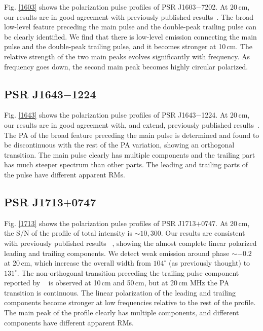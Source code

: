 \documentclass[useAMS,usenatbib]{mn2e}
\begin{document}
\begin{appendix}
Fig. \ref{1603} shows the polarization pulse profiles of 
PSR J1603$-$7202.
%
At 20\,cm, our results are in good agreement with previously published
results~\citep{Ord04,Yan11}.
%
The broad low-level feature preceding the main pulse and the double-peak trailing 
pulse can be clearly identified.
%
We find that there is low-level emission connecting the main pulse and the 
double-peak trailing pulse, and it becomes stronger at 10\,cm.
%
The relative strength of the two main peaks evolves significantly with frequency.
%
As frequency goes down, the second main peak becomes highly circular polarized.


\subsection{PSR J1643$-$1224}

Fig. \ref{1643} shows the polarization pulse profiles of 
PSR J1643$-$1224.
%
At 20\,cm, our results are in good agreement with, and extend, previously published
results~\citep{Ord04,Yan11}.
%
The PA of the broad feature preceding the main pulse is determined and 
found to be discontinuous with the rest of the PA variation, showing 
an orthogonal transition.
%
The main pulse clearly has multiple components and the trailing part has much 
steeper spectrum than other parts. The leading and trailing parts of the pulse 
have different apparent RMs.

\subsection{PSR J1713$+$0747}

Fig. \ref{1713} shows the polarization pulse profiles of 
PSR J1713$+$0747. 
%
At 20\,cm, the S/N of the profile of total intensity is $\sim10,300$. 
Our results are consistent with previously published results
~\citep{Ord04,Yan11}, showing the almost complete linear polarized leading and 
trailing components.
%
We detect weak emission around phase $\sim-0.2$ at 20\,cm, which 
increase the overall width from $104^{\circ}$ (as previously thought) to 
$131^{\circ}$. 
%
The non-orthogonal transition preceding the trailing pulse component reported 
by ~\citet{Yan11} is observed at 10\,cm and 50\,cm, but at 20\,cm MHz 
the PA transition is continuous.
%
The linear polarization of the leading and trailing components become stronger 
at low frequencies relative to the rest of the profile.
%
The main peak of the profile clearly has multiple components, and different 
components have different apparent RMs.


\end{appendix}
\end{document}
